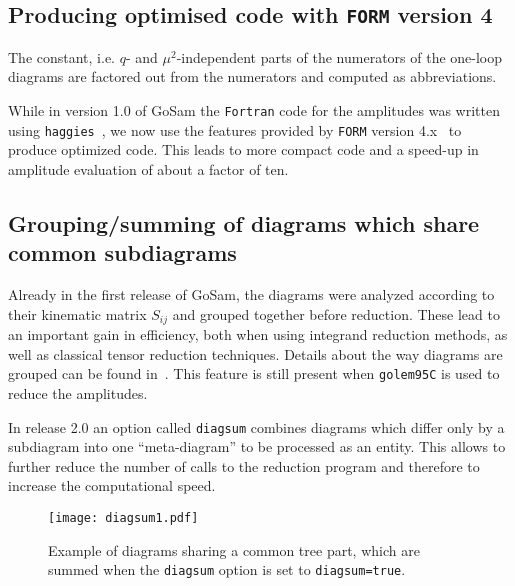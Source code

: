 \documentclass[11pt,a4paper]{refrep}
\newcommand{\gosam}{{\sc GoSam}\xspace}
\newcommand{\golemVC}{{\tt golem95C}\xspace}
\newcommand{\form}{{\tt FORM}\xspace}
\newcommand{\haggies}{{\tt haggies}\xspace}
\begin{document}

\subsection{Producing optimised code  with {\tt FORM} version 4}

The constant, i.e. $q$- and $\mu^2$-independent parts of the numerators
of the one-loop diagrams are factored out from the numerators and computed
as abbreviations. 

While in version 1.0 of \gosam{} the {\tt Fortran} code for the
amplitudes was written using \haggies~\cite{Reiter:2009ts}, we now
use the features provided by \form{} version
4.x~\cite{Kuipers:2012rf} to produce optimized code. This leads to more
compact code and a speed-up in amplitude evaluation of about a factor
of ten.

\subsection{Grouping/summing of diagrams which share common subdiagrams}
\label{sec:grouping_summing}
Already in the first release of \gosam{}, the diagrams were analyzed
according to their kinematic matrix $S_{ij}$ and grouped together
before reduction. These lead to an important gain in efficiency, both
when using integrand reduction methods, as well as 
classical tensor reduction techniques. Details about the way diagrams
are grouped can be found in~\cite{Cullen:2011ac}. This feature is
still present when \golemVC{} is used to reduce the
amplitudes.

In release 2.0 an option called {\tt diagsum} combines diagrams
which differ only by a subdiagram into one ``meta-diagram'' to be
processed as an entity. This allows to further reduce the number of
calls to the reduction program and therefore to increase the
computational speed. 

\begin{figure}[htb]
\centering
\texttt{[image: diagsum1.pdf]}
\caption{Example of diagrams sharing a common tree part, which are 
summed when the {\tt diagsum} option is set to {\tt diagsum=true}.}
\label{fig:diagsum_tree}
\end{figure} 
\end{document}
